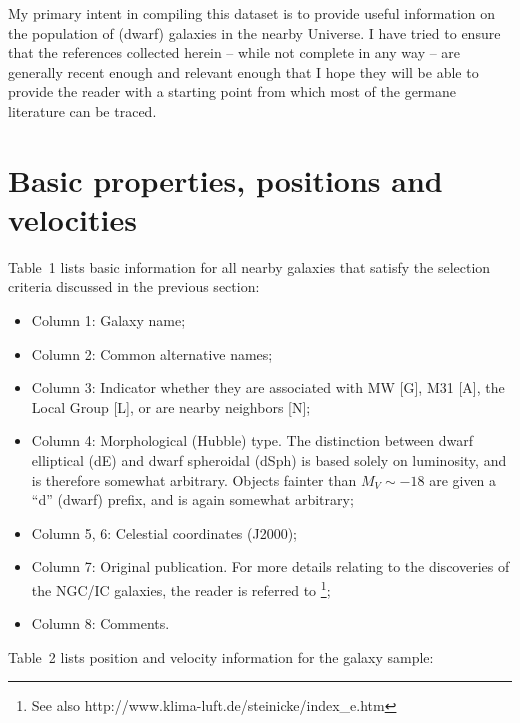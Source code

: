 \documentclass[manuscript]{aastex}
\begin{document}
My primary intent in compiling this dataset is to provide useful
information on the population of (dwarf) galaxies in the nearby
Universe. I have tried to ensure that the references collected herein
-- while not complete in any way -- are generally recent enough and
relevant enough that I hope they will be able to provide the reader
with a starting point from which most of the germane literature can be
traced.

\section{Basic properties, positions and velocities}

Table~1 lists basic information for all nearby galaxies that satisfy the selection criteria
discussed in the previous section:

\begin{itemize}
\item Column 1: Galaxy name;
\item Column 2: Common alternative names;
\item Column 3: Indicator whether they are associated with MW [G], M31
  [A], the Local Group [L], or are nearby neighbors [N];
\item Column 4: Morphological (Hubble) type. The distinction between
  dwarf elliptical (dE) and dwarf spheroidal (dSph) is based solely on
  luminosity, and is therefore somewhat arbitrary. Objects fainter
  than $M_V \sim -18$ are given a ``d'' (dwarf) prefix, and is again
  somewhat arbitrary;
\item Column 5, 6: Celestial coordinates (J2000);
\item Column 7: Original publication. For more details relating to the
  discoveries of the NGC/IC galaxies, the reader is referred to
  \cite{steinicke2010}\footnote{See also
    http://www.klima-luft.de/steinicke/index\_e.htm};
\item Column 8: Comments.
\end{itemize}

Table~2 lists position and velocity information for the galaxy sample:
\end{document}
